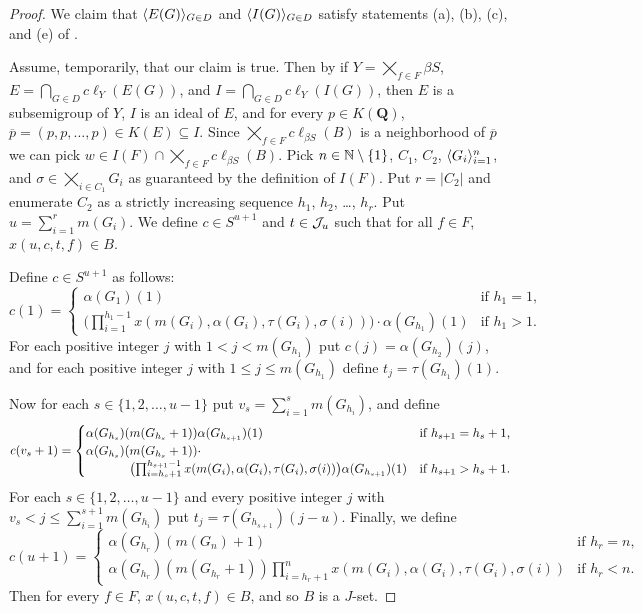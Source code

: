 \begin{proof}
  We claim that $\langle E(G) \rangle_{G \in D}$ and $\langle I(G) \rangle_{G \in D}$ satisfy statements (a), (b), (c), and (e) of \cite[Lemma 14.9]{Hindman:1998fk}.

  Assume, temporarily, that our claim is true. 
  Then by \cite[Lemma 14.9]{Hindman:1998fk} if $Y = \bigtimes_{f \in F} \beta S$, $E = \bigcap_{G \in D} c\ell_Y(E(G))$, and $I = \bigcap_{G \in D} c\ell_Y(I(G))$, then $E$ is a subsemigroup of $Y$, $I$ is an ideal of $E$, and for every $p \in K(\mathbf{Q})$, $\overline{p} = (p, p, \ldots, p) \in K(E) \subseteq I$. 
  Since $\bigtimes_{f \in F} c\ell_{\beta S} (B)$ is a neighborhood of $\overline{p}$ we can pick $w \in I(F) \cap \bigtimes_{f \in F} c\ell_{\beta S} (B)$. 
  Pick $n \in \mathbb{N}\setminus \{1\}$, $C_1$, $C_2$, $\langle G_i \rangle_{i=1}^n$, and $\sigma \in \bigtimes_{i \in C_1} G_i$ as guaranteed by the definition of $I(F)$. 
  Put $r = |C_2|$ and enumerate $C_2$ as a strictly increasing sequence $h_1$, $h_2$, \dots, $h_r$.
  Put $u = \sum_{i=1}^r m(G_i)$.
  We define $c \in S^{u+1}$ and $t \in \mathcal{J}_u$ such that for all $f \in F$, $x(u, c, t, f) \in B$.

  Define $c \in S^{u+1}$ as follows:
  \[
    c(1) = 
    \begin{cases}
      \alpha(G_1)(1) & \mbox{if $h_1 = 1$,} \\
      \bigl(\prod_{i=1}^{h_1-1} x(m(G_i), \alpha(G_i), \tau(G_i), \sigma(i))\bigr) \cdot \alpha(G_{h_1})(1) & \mbox{if $h_1 > 1$.}
    \end{cases}
  \]
  For each positive integer $j$ with $1 < j < m(G_{h_1})$ put $c(j) = \alpha(G_{h_2})(j)$, and for each positive integer $j$ with $1 \le j \le m(G_{h_1})$ define $t_j = \tau(G_{h_1})(1)$. 

  Now for each $s \in \{1, 2, \ldots, u-1\}$ put $v_s = \sum_{i=1}^s m(G_{h_i})$, and define
  \[
    c(v_s+1) = 
    \begin{cases}
      \alpha(G_{h_s})(m(G_{h_s}+1))\alpha(G_{h_{s+1}})(1) & \mbox{if $h_{s+1} = h_s + 1$,} \\

      \alpha(G_{h_s})(m(G_{h_s}+1))\cdot & \\
      \hspace{3.5em}\bigl(\prod_{i=h_{s}+1}^{h_{s+1}-1} x(m(G_i), \alpha(G_i), \tau(G_i), \sigma(i))\bigr)\alpha(G_{h_{s+1}})(1) & \mbox{if $h_{s+1} > h_s+1$.}
    \end{cases}
  \]
  For each $s \in \{1, 2, \ldots, u-1\}$ and every positive integer $j$ with $v_s < j \le \sum_{i=1}^{s+1} m(G_{h_i})$ put $t_j = \tau(G_{h_{s+1}})(j-u)$. 
  Finally, we define
  \[
    c(u+1) = 
    \begin{cases}
      \alpha(G_{h_r})(m(G_n) + 1) & \mbox{if $h_r = n$,} \\
      \alpha(G_{h_r})(m(G_{h_r}+1))\prod_{i=h_r+1}^n x(m(G_i), \alpha(G_i), \tau(G_i), \sigma(i)) & \mbox{if $h_r < n$.}
    \end{cases}
  \]
  Then for every $f \in F$, $x(u, c, t, f) \in B$, and so $B$ is a $J$-set.


\end{proof}
